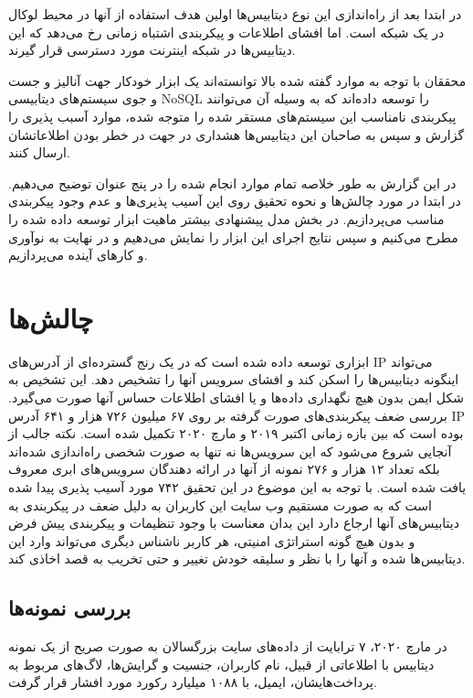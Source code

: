 \documentclass[10pt, a4paper]{article}
\begin{document}
در ابتدا بعد از راه‌اندازی این نوع دیتابیس‌ها اولین هدف استفاده از آنها در محیط
لوکال در یک شبکه است. اما افشای اطلاعات و پیکربندی اشتباه زمانی رخ می‌دهد که این
دیتابیس‌ها در شبکه اینترنت مورد دسترسی قرار گیرند.

محققان با توجه به موارد گفته شده بالا توانسته‌اند یک ابزار خودکار جهت آنالیز و
جست و جوی سیستم‌های دیتابیسی NoSQL را توسعه داده‌اند که به وسیله آن می‌توانند
پیکربندی نامناسب این سیستم‌های مستقر شده را متوجه شده، موارد آسبب پذیری را گزارش
و سپس به صاحبان این دیتابیس‌ها هشداری در جهت در خطر بودن اطلاعاتشان ارسال کنند.

در این گزارش به طور خلاصه تمام موارد انجام شده را در پنج عنوان توضیح می‌دهیم. در
ابتدا در مورد چالش‌ها و نحوه تحقیق روی این آسیب پذیری‌ها و عدم وجود پیکربندی
مناسب می‌پردازیم. در بخش مدل پیشنهادی بیشتر ماهیت ابزار توسعه داده شده را مطرح
می‌کنیم و سپس نتایج اجرای این ابزار را نمایش می‌دهیم و در نهایت به نوآوری و
کار‌های آینده می‌پردازیم.

\section{چالش‌ها}

ابزاری توسعه داده شده است که در یک رنج گسترده‌ای از آدرس‌های IP می‌تواند اینگونه
دیتابیس‌ها را اسکن کند و افشای سرویس آنها را تشخیص دهد. این تشخیص به شکل ایمن
بدون هیچ نگهداری داده‌ها و یا افشای اطلاعات حساس آنها صورت می‌گیرد. بررسی ضعف
پیکربندی‌های صورت گرفته بر روی ۶۷ میلیون ۷۲۶ هزار و ۶۴۱ آدرس IP بوده است که بین
بازه زمانی اکتبر ۲۰۱۹ و مارچ ۲۰۲۰ تکمیل شده است. نکته جالب از آنجایی شروع می‌شود
که این سرویس‌ها نه تنها به صورت شخصی راه‌اندازی شده‌اند بلکه تعداد ۱۲ هزار و ۲۷۶
نمونه از آنها در ارائه دهندگان سرویس‌های ابری معروف یافت شده است.  با توجه به
این موضوع در این تحقیق ۷۴۲ مورد آسیب پذیری پیدا شده است که به صورت مستقیم وب
سایت این کاربران به دلیل ضعف در پیکربندی به دیتابیس‌های آنها ارجاع دارد این بدان
معناست با وجود تنظیمات و پیکربندی پیش فرض و بدون هیچ گونه استراتژی امنیتی، هر
کاربر ناشناس دیگری می‌تواند وارد این دیتابیس‌ها شده و آنها را با نظر و سلیقه
خودش تغییر و حتی تخریب به قصد اخاذی کند.

\subsection{بررسی نمونه‌ها}

در مارچ ۲۰۲۰، ۷ ترابایت از داده‌های سایت بزرگسالان به صورت صریح از یک نمونه
دیتابیس  با اطلاعاتی از قبیل، نام کاربران، جنسیت و گرایش‌ها،
لاگ‌های مربوط به پرداخت‌هایشان، ایمیل، با ۱۰۸۸ میلیارد رکورد مورد افشار قرار
گرفت.
\end{document}
